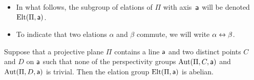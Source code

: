 \begin{ntn}${}$
    \begin{itemize}
        \item In what follows, the subgroup of elations of\/ $\Pi$ with axis\/~$\mathsf a$ will be denoted\/ $\mathrm{Elt}(\Pi,\mathsf a)$.

        \item To indicate that two elations\/ $\alpha$ and $\beta$ commute, we will write\/ $\alpha\mathrel\leftrightarrow\beta$.
    \end{itemize}
\end{ntn}

\begin{thm}\label{thm:abelian-elation-group}
    Suppose that a projective plane\/ $\Pi$ contains a line\/ $\mathsf a$ and two distinct\/ points $C$ and\/ $D$ on\/ $\mathsf a$ such that none of the perspectivity groups\/ $\operatorname{Aut}(\Pi, C, \mathsf a)$ and\/ $\operatorname{Aut}(\Pi, D, \mathsf a)$ is trivial. Then the elation group\/ $\mathrm{Elt}(\Pi, \mathsf a)$ is abelian.
\end{thm}

